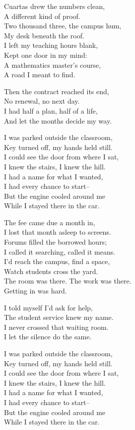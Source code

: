 \begin{lyrics}
Cuartas drew the numbers clean,\\
A different kind of proof.\\
Two thousand three, the campus hum,\\
My desk beneath the roof.\\
I left my teaching hours blank,\\
Kept one door in my mind:\\
A mathematics master's course,\\
A road I meant to find.

Then the contract reached its end,\\
No renewal, no next day.\\
I had half a plan, half of a life,\\
And let the months decide my way.

I was parked outside the classroom,\\
Key turned off, my hands held still.\\
I could see the door from where I sat,\\
I knew the stairs, I knew the hill.\\
I had a name for what I wanted,\\
I had every chance to start--\\
But the engine cooled around me\\
While I stayed there in the car.

The fee came due a month in,\\
I lost that month asleep to screens.\\
Forums filled the borrowed hours;\\
I called it searching, called it means.\\
I'd reach the campus, find a space,\\
Watch students cross the yard.\\
The room was there. The work was there.\\
Getting in was hard.

I told myself I'd ask for help,\\
The student service knew my name.\\
I never crossed that waiting room.\\
I let the silence do the same.

I was parked outside the classroom,\\
Key turned off, my hands held still.\\
I could see the door from where I sat,\\
I knew the stairs, I knew the hill.\\
I had a name for what I wanted,\\
I had every chance to start--\\
But the engine cooled around me\\
While I stayed there in the car.


\end{lyrics}
